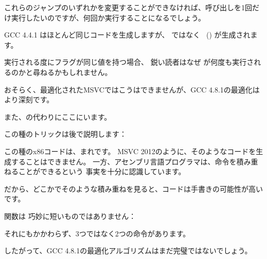 これらのジャンプのいずれかを変更することができなければ、\printf 呼び出しを1回だけ実行したいのですが、何回か実行することになるでしょう。


\NonOptimizing GCC 4.4.1 
はほとんど同じコードを生成しますが、 \printf ではなく \puts~() が生成されます。


実行される度にフラグが同じ値を持つ場合、
鋭い読者はなぜ \CMP が何度も実行されるのかと尋ねるかもしれません。

おそらく、最適化されたMSVCではこうはできませんが、GCC 4.8.1の最適化はより深刻です。



また、の代わりにここにいます。

この種のトリックは後で説明します：

この種のx86コードは、まれです。
MSVC 2012のように、そのようなコードを生成することはできません。 
一方、アセンブリ言語プログラマは、命令を積み重ねることができるという
事実を十分に認識しています。

だから、どこかでそのような積み重ねを見ると、コードは手書きの可能性が高いです。

関数は
巧妙に短いものではありません：



それにもかかわらず、3つではなく2つの命令があります。

したがって、GCC 4.8.1の最適化アルゴリズムはまだ完璧ではないでしょう。
